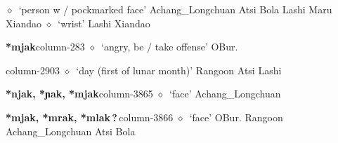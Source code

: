 \hspace{1ex}
         $\diamond$~`person w / pockmarked face'
         Achang\_Longchuan 
\hspace{1ex}
         Atsi 
\hspace{1ex}
         Bola 
\hspace{1ex}
         Lashi 
\hspace{1ex}
         Maru 
\hspace{1ex}
         Xiandao 
\hspace{1ex}
         $\diamond$~`wrist'
         Lashi 
\hspace{1ex}
         Xiandao 
  \item {\footnotesize \textbf{*mjak}}{\tiny column-283}
         $\diamond$~`angry, be / take offense'
         OBur. 
  \item {\footnotesize \textbf{}}{\tiny column-2903}
         $\diamond$~`day (first of lunar month)'
         Rangoon 
\hspace{1ex}
         Atsi 
\hspace{1ex}
         Lashi 
  \item {\footnotesize \textbf{*njak, *ɲak, *mjak}}{\tiny column-3865}
         $\diamond$~`face'
         Achang\_Longchuan 
  \item {\footnotesize \textbf{*mjak, *mrak, *mlak\,?\,}}{\tiny column-3866}
         $\diamond$~`face'
         OBur. 
\hspace{1ex}
         Rangoon 
\hspace{1ex}
         Achang\_Longchuan 
\hspace{1ex}
         Atsi 
\hspace{1ex}
         Bola 
\hspace{1ex}
